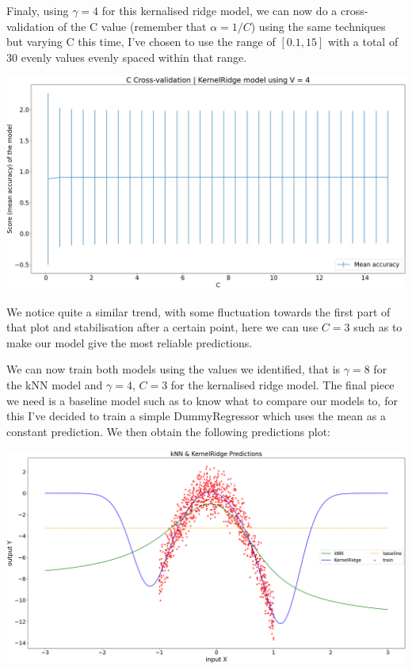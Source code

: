 \documentclass[10pt]{article}
\begin{document}
Finaly, using $\gamma = 4$ for this kernalised ridge model, we can now do a cross-validation of the C value (remember that 
$\alpha = 1 / C$) using the same techniques but varying C this time, I've chosen to use the range of $[0.1, 15]$ with 
a total of 30 evenly values evenly spaced within that range.

\begin{center}
    \includegraphics[scale=0.25]{kridge_crossval_c.png}
\end{center}

We notice quite a similar trend, with some fluctuation towards the first part of that plot and stabilisation
after a certain point, here we can use $C = 3$ such as to make our model give the most reliable predictions.

We can now train both models using the values we identified, that is $\gamma = 8$ for the kNN model and 
$\gamma = 4$, $C = 3$ for the kernalised ridge model. The final piece we need is a baseline model such as to
know what to compare our models to, for this I've decided to train a simple DummyRegressor which uses the mean as a
constant prediction. We then obtain the following predictions plot:

\begin{center}
    \includegraphics[scale=0.25]{optimised.png}
\end{center}
\end{document}

